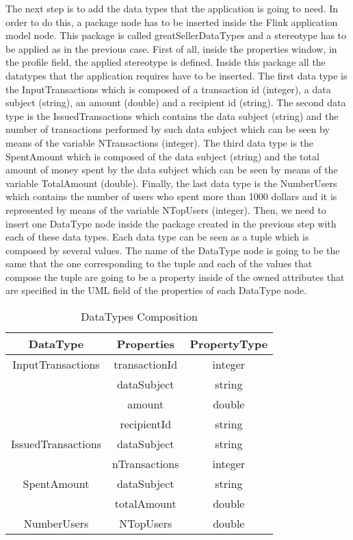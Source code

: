 The next step is to add the data types that the application is going to need. In order to do this, a package node has to be inserted inside the Flink application model node. This package is called greatSellerDataTypes and a stereotype has to be applied as in the previous case. First of all, inside the properties window, in the profile field, the applied stereotype is defined. Inside this package all the datatypes that the application requires have to be inserted. The first data type is the InputTransactions which is composed of a transaction id (integer), a data subject (string), an amount (double) and a recipient id (string). The second data type is the IssuedTransactions which contains the data subject (string) and the number of transactions performed by such data subject which can be seen by means of the variable NTransactions (integer). The third data type is the SpentAmount which is composed of the data subject (string) and the total amount of money spent by the data subject which can be seen by means of the variable TotalAmount (double). Finally, the last data type is the NumberUsers which contains the number of users who spent more than 1000 dollars and it is represented by means of the variable NTopUsers (integer). Then, we need to insert one DataType node inside the package created in the previous step with each of these data types. Each data type can be seen as a tuple which is composed by several values. The name of the DataType node is going to be the same that the one corresponding to the tuple and each of the values that compose the tuple are going to be a property inside of the owned attributes that are specified in the UML field of the properties of each DataType node.

\begin{table}[h!]
\centering
	\begin{tabular}{||c|c|c||} 
	\hline\hline
	DataType & Properties & PropertyType \\ [1ex] 
	\hline\hline
	InputTransactions & transactionId & integer  \\
	& dataSubject & string  \\
	& amount & double  \\
	& recipientId & string  \\
	\hline
	IssuedTransactions & dataSubject & string  \\
	& nTransactions & integer \\
	\hline
	SpentAmount & dataSubject & string  \\
	& totalAmount & double \\
	\hline
	NumberUsers & NTopUsers & double  \\
	\hline\hline
	\end{tabular}
\caption{DataTypes Composition}
\label{DataTypes Composition}
\end{table}

